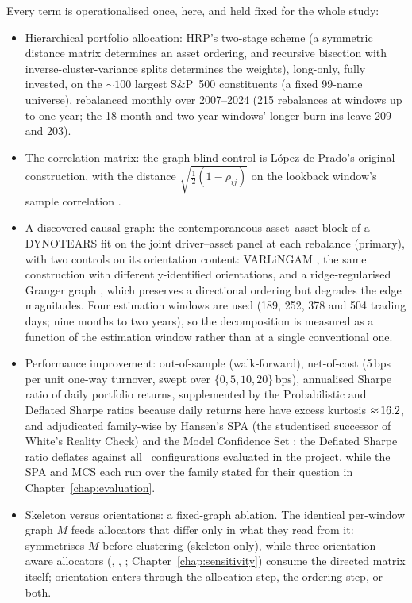 \noindent Every term is operationalised once, here, and held fixed for the
whole study:
\begin{itemize}[itemsep=1pt, topsep=3pt]
  \item Hierarchical portfolio allocation: HRP's two-stage scheme
    (a symmetric distance matrix determines an asset ordering, and recursive
    bisection with inverse-cluster-variance splits determines the weights),
    long-only, fully invested, on the ${\sim}100$ largest S\&P~500
    constituents (a fixed 99-name universe), rebalanced monthly over
    2007--2024 (215 rebalances at windows up to one year; the 18-month and
    two-year windows' longer burn-ins leave 209 and 203).
  \item The correlation matrix: the graph-blind control \HRP{} is
    López de Prado's original construction, with the distance
    $\sqrt{\tfrac{1}{2}(1-\rho_{ij})}$ on the lookback window's sample
    correlation \cite{lopezdeprado2016hrp}.
  \item A discovered causal graph: the contemporaneous asset--asset
    block of a DYNOTEARS fit on the joint driver--asset panel at each
    rebalance (primary), with two controls on its orientation content:
    VARLiNGAM \cite{hyvarinen2010varlingam}, the same construction with
    differently-identified orientations, and a ridge-regularised Granger
    graph \cite{granger1969investigating}, which preserves a directional
    ordering but degrades the edge magnitudes. Four estimation windows are
    used (189, 252, 378 and 504 trading days; nine months to two years), so
    the decomposition is measured as a function of the estimation window
    rather than at a single conventional one.
  \item Performance improvement: out-of-sample (walk-forward), net-of-cost
    (5\,bps per unit one-way turnover, swept over $\{0,5,10,20\}$\,bps),
    annualised Sharpe ratio of daily portfolio returns, supplemented by the
    Probabilistic and Deflated Sharpe ratios
    \cite{bailey2012psr,bailey2014deflated} because daily returns here have
    excess kurtosis ${\approx}\,16.2$, and adjudicated family-wise by
    Hansen's SPA (the studentised successor of White's Reality Check) and
    the Model Confidence Set
    \cite{white2000reality,hansen2005spa,hansen2011mcs}; the Deflated
    Sharpe ratio deflates against all \rsNtrials\ configurations evaluated
    in the project, while the SPA and MCS each run over the
    family stated for their question in Chapter~\ref{chap:evaluation}.
  \item Skeleton versus orientations: a fixed-graph ablation.
    The identical per-window graph $M$ feeds allocators that differ only in
    what they read from it: \skelsamp{} symmetrises $M$ before clustering (skeleton
    only), while three orientation-aware allocators (\skelsem{}, \orientsamp{}, \orientsem{};
    Chapter~\ref{chap:sensitivity}) consume the directed matrix itself;
    orientation enters through the allocation step, the ordering step, or
    both.
\end{itemize}

